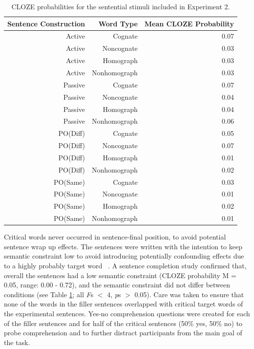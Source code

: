 \begin{table}[htbp]
  \centering
  \caption{CLOZE probabilities for the sentential stimuli included in Experiment 2.}
    \begin{tabular}{rrr}
    \toprule
    Sentence Construction & Word Type & Mean CLOZE Probability \\
    \midrule
    Active & Cognate & 0.07 \\
    Active & Noncognate & 0.03 \\
    Active & Homograph & 0.03 \\
    Active & Nonhomograph & 0.03 \\
    Passive & Cognate & 0.07 \\
    Passive & Noncognate & 0.04 \\
    Passive & Homograph & 0.04 \\
    Passive & Nonhomograph & 0.06 \\
    PO(Diff) & Cognate & 0.05 \\
    PO(Diff) & Noncognate & 0.07 \\
    PO(Diff) & Homograph & 0.01 \\
    PO(Diff) & Nonhomograph & 0.02 \\
    PO(Same) & Cognate & 0.03 \\
    PO(Same) & Noncognate & 0.01 \\
    PO(Same) & Homograph & 0.02 \\
    PO(Same) & Nonhomograph & 0.01 \\
    \bottomrule
    \end{tabular}%
  \label{tab:incon.cloze}%
\end{table}%


Critical words never occurred in sentence-final position, to avoid potential sentence wrap up effects. The sentences were written with the intention to keep semantic constraint low to avoid introducing potentially confounding effects due to a highly probably target word ~\citep[e.g.,][]{Schwartz2006}. A sentence completion study confirmed that, overall the sentences had a low semantic constraint (CLOZE probability M = 0.05, range: 0.00 - 0.72), and the semantic constraint did not differ between conditions (see Table \ref{tab:incon.cloze}; all \emph{F}s $<$ 4, \emph{p}s $>$ 0.05). Care was taken to ensure that none of the words in the filler sentences overlapped with critical target words of the experimental sentences. Yes-no comprehension questions were created for each of the filler sentences and for half of the critical sentences (50\% yes, 50\% no) to probe comprehension and to further distract participants from the main goal of the task.

